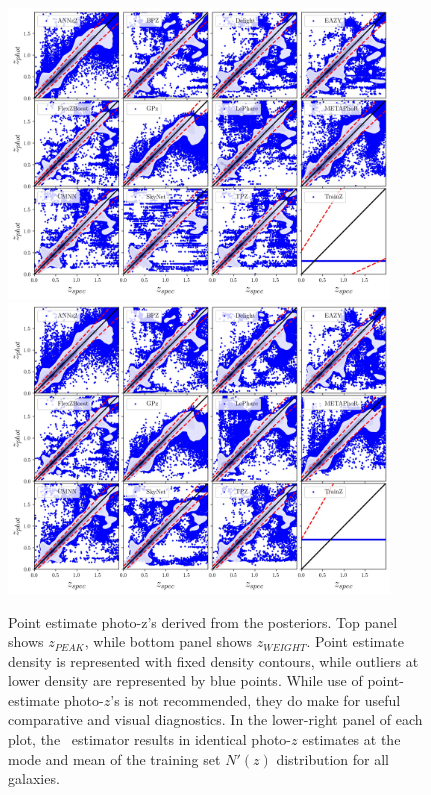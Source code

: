 \begin{figure}
\centering
\includegraphics[width=0.9\textwidth]{fig/ZPEAK_szpz_threecolumn_12codes_navy.jpg}\\
\includegraphics[width=0.9\textwidth]{fig/ZWEIGHT_szpz_threecolumn_12codes_navy.jpg}
\caption{Point estimate photo-z's derived from the posteriors. Top panel shows $z_{PEAK}$, while bottom panel shows $z_{WEIGHT}$.  Point estimate density is represented with fixed density contours, while outliers at lower density are represented by blue points.  While use of point-estimate photo-$z$'s is not recommended, they do make for useful comparative and visual diagnostics.  In the lower-right panel of each plot, the \trainz\ estimator results in identical photo-$z$ estimates at the mode and mean of the training set $N'(z)$ distribution for all galaxies.} \label{fig:pz_pointestimates}
\end{figure}


